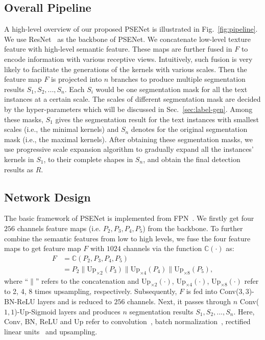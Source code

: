 \documentclass[10pt,twocolumn,letterpaper]{article}
\begin{document}
	\subsection{Overall Pipeline}
	A high-level overview of our proposed PSENet is illustrated in Fig.~\ref{fig:pipeline}. 
	We use ResNet~\cite{he2016identity} as the backbone of PSENet. 
	We concatenate low-level texture feature with high-level semantic feature. These maps are further fused in $F$ to encode information with various receptive views. Intuitively, such fusion is very likely to facilitate the generations of the kernels with various scales. Then the feature map $F$ is projected into $n$ branches to produce multiple segmentation results $S_1, S_2, ..., S_n$. Each $S_i$ would be one segmentation mask for all the text instances at a certain scale. The scales of different segmentation mask are decided by the hyper-parameters which will be discussed in Sec.~\ref{sec:label-gen}.
	Among these masks, $S_1$ gives the segmentation result for the text instances with smallest scales (i.e., the minimal kernels) and $S_n$ denotes for the original segmentation mask (i.e., the maximal kernels). After obtaining these segmentation masks, we use progressive scale expansion algorithm to gradually expand all the instances' kernels in $S_1$, to their complete shapes in $S_n$, and obtain the final detection results as $R$.
	
	\subsection{Network Design}
	The basic framework of PSENet is implemented from FPN~\cite{lin2017feature}. We firstly get four $256$ channels feature maps (i.e. $P_2, P_3, P_4, P_5$) from the backbone. To further combine the semantic features from low to high levels, we fuse the four feature maps to get feature map $F$ with $1024$ channels via the function $\mathbb{C}(\cdot)$ as:
	\begin{equation}
	\begin{split}
	F &= \mathbb{C}(P_2, P_3, P_4, P_5) \\
	&= P_2 \parallel \mbox{Up}_{\times 2}(P_3) \parallel \mbox{Up}_{\times 4}(P_4) \parallel \mbox{Up}_{\times 8}(P_5),
	\label{eqn:c_fun}
	\end{split}
	\end{equation}
	where ``$\parallel$'' refers to the concatenation and $\mbox{Up}_{\times 2}(\cdot)$, $\mbox{Up}_{\times 4}(\cdot)$, $\mbox{Up}_{\times 8}(\cdot)$ refer to 2, 4, 8 times upsampling, respectively. Subsequently, $F$ is fed into Conv($3, 3$)-BN-ReLU layers and is reduced to $256$ channels. Next, it passes through $n$ 
	Conv($1, 1$)-$\mbox{Up}$-Sigmoid layers and produces $n$ segmentation results $S_1, S_2, ..., S_n$. Here, Conv, BN, ReLU and $\mbox{Up}$ refer to convolution~\cite{lecun1998gradient}, batch normalization~\cite{ioffe2015batch}, rectified linear units~\cite{glorot2011deep} and upsampling.
	
\end{document}
